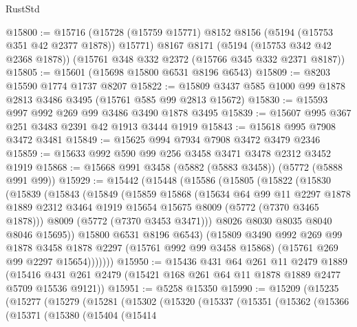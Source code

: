 \begin{lexlean}{RustStd}
\begin{coremodule}
{\begin{coremodule}
{{{{{{{{{{{{{{{{{{{{{{{{{{{{{@15800 := @15716
    (@15728 (@15759 @15771) @8152 @8156 (@5194 (@15753 @351 @42 @2377 @1878)) @15771)
    @8167
    @8171
    (@5194 (@15753 @342 @42 @2368 @1878))
    (@15761 @348 @332 @2372 (@15766 @345 @332 @2371 @8187))
@15805 := @15601 (@15698 @15800 @6531 @8196 @6543)
@15809 := @8203 @15590 @1774 @1737 @8207
@15822 := @15809 @3437 @585 @1000 @99 @1878 @2813 @3486 @3495 (@15761 @585 @99 @2813 @15672)
@15830 := @15593 @997 @992 @269 @99 @3486 @3490 @1878 @3495
@15839 := @15607 @995 @367 @251 @3483 @2391 @42 @1913 @3444 @1919
@15843 := @15618 @995 @7908 @3472 @3481
@15849 := @15625 @994 @7934 @7908 @3472 @3479 @2346
@15859 := @15633 @992 @590 @99 @256 @3458 @3471 @3478 @2312 @3452 @1919
@15868 := @15668 @991 @3458 (@5882 (@5883 @3458)) (@5772 (@5888 @991 @99))
@15929 := @15442
    (@15448
      (@15586
        (@15805
          (@15822
            (@15830
              (@15839
                (@15843
                  (@15849
                    (@15859
                      @15868
                      (@15634
                        @64
                        @99
                        @11
                        @2297
                        @1878
                        @1889
                        @2312
                        @3464
                        @1919
                        @15654
                        @15675
                        @8009
                        (@5772 (@7370 @3465 @1878)))
                      @8009
                      (@5772 (@7370 @3453 @3471)))
                    @8026
                    @8030
                    @8035
                    @8040
                    @8046
                    @15695))
                @15800
                @6531
                @8196
                @6543)
              (@15809
                @3490
                @992
                @269
                @99
                @1878
                @3458
                @1878
                @2297
                (@15761 @992 @99 @3458 @15868)
                (@15761 @269 @99 @2297 @15654)))))))
@15950 := @15436
    @431
    @64
    @261
    @11
    @2479
    @1889
    (@15416 @431 @261 @2479 (@15421 @168 @261 @64 @11 @1878 @1889 @2477 @5709 @15536 @9121))
@15951 := @5258 @15350
@15990 := @15209
    (@15235
      (@15277
        (@15279
          (@15281
            (@15302
              (@15320
                (@15337
                  (@15351
                    (@15362
                      (@15366
                        (@15371
                          (@15380
                            (@15404
                              (@15414
}}}}}}}}}}}}}}}}}}}}}}}}}}}}}
\end{coremodule}}
\end{coremodule}
\end{lexlean}
